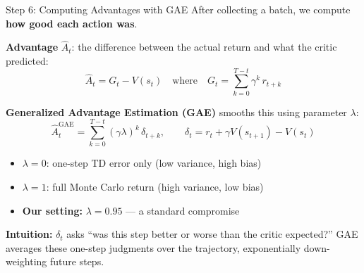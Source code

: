 \documentclass[aspectratio=169,11pt]{beamer}
\begin{document}
\begin{frame}{Step 6: Computing Advantages with GAE}
  \small
  After collecting a batch, we compute \textbf{how good each action was}.

  \medskip
  \textbf{Advantage} $\hat{A}_t$: the difference between the actual return and what the critic predicted:
  \[
    \hat{A}_t = G_t - V(s_t)
    \quad\text{where}\quad
    G_t = \sum_{k=0}^{T-t} \gamma^k\, r_{t+k}
  \]
  \vspace{-6pt}

  \textbf{Generalized Advantage Estimation (GAE)} smooths this using parameter $\lambda$:
  \[
    \hat{A}_t^\text{GAE} = \sum_{k=0}^{T-t} (\gamma \lambda)^k \,\delta_{t+k},
    \qquad \delta_t = r_t + \gamma V(s_{t+1}) - V(s_t)
  \]
  \vspace{-6pt}

  \begin{itemize}\setlength\itemsep{1pt}
    \item $\lambda = 0$: one-step TD error only (low variance, high bias)
    \item $\lambda = 1$: full Monte Carlo return (high variance, low bias)
    \item \textbf{Our setting:} $\lambda = 0.95$ --- a standard compromise
  \end{itemize}

  \smallskip
  \textbf{Intuition:} $\delta_t$ asks ``was this step better or worse than the critic expected?''
  GAE averages these one-step judgments over the trajectory, exponentially down-weighting
  future steps.
\end{frame}
\end{document}
